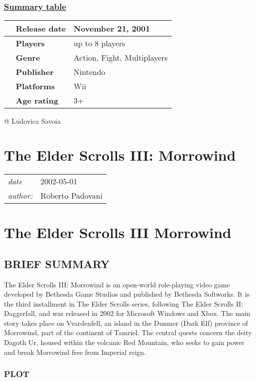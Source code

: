 \documentclass[a4paper,10pt]{book}
\newcommand{\pageHeader}[4]{
    \section{#1}
    \vspace{-0.3cm}
    \begin{table}[h!]
     \begin{tabular}{ll}
        \hline
        \textit{date} & #2 \\
        \textit{author: } & #3\\
        \hline
     \end{tabular}
    \end{table}
    \vspace{-0.3cm}
}
\begin{document}
 \subsubsection{\underline{Summary table }}
 \begin{longtable}{p{1mm}|l|l|}\hline
 
 & \textbf{Release date } 
 & November 21, 2001 
 \\\hline
 
 & \textbf{Players } 
 & up to 8 players 
 \\\hline
 
 & \textbf{Genre } 
 & Action, Fight, Multiplayers 
 \\\hline
 
 & \textbf{Publisher } 
 & Nintendo 
 \\\hline
 
 & \textbf{Platforms } 
 & Wii 
 \\\hline
 
 & \textbf{Age rating } 
 & 3+ 
 \\\hline
 \end{longtable}
 
 @ Ludovica Savoia  
 
 \newpage\pageHeader{The Elder Scrolls III: Morrowind}{2002-05-01}{Roberto Padovani}{Third chapter of the Elder Scrolls}
 \section{ The Elder Scrolls III Morrowind }
 \subsection{BRIEF SUMMARY }
 
          The Elder Scrolls III: Morrowind is an open-world role-playing video game developed by Bethesda Game Studios and published by Bethesda Softworks. It is the third installment in The Elder Scrolls series, following The Elder Scrolls II: Daggerfall, and was released in 2002 for Microsoft Windows and Xbox. The main story takes place on Vvardenfell, an island in the Dunmer (Dark Elf) province of Morrowind, part of the continent of Tamriel. The central quests concern the deity Dagoth Ur, housed within the volcanic Red Mountain, who seeks to gain power and break Morrowind free from Imperial reign.
         
 
 \subsubsection{PLOT }
 
\end{document}
